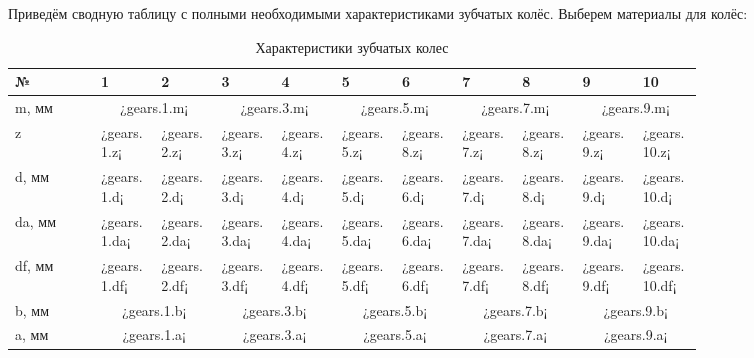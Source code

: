 \documentclass[14pt,a4paper,russian]{scrartcl}
\begin{document}
        Приведём сводную таблицу с полными необходимыми характеристиками зубчатых колёс.
        Выберем материалы для колёс:
        \begin{table}[h!]
            \begin{center}
                \begin{tabular}{p{0.1\linewidth}|p{0.07\linewidth}p{0.07\linewidth}p{0.07\linewidth}p{0.07\linewidth}p{0.07\linewidth}p{0.07\linewidth}p{0.07\linewidth}p{0.07\linewidth}p{0.07\linewidth}p{0.07\linewidth}}
                    \hline
                    №   & 1&2&3&4&5&6&7&8&9&10\\
                    \hline
                    m, мм  & \multicolumn{2}{c}{¿gears.1.m¡} & \multicolumn{2}{c}{¿gears.3.m¡} & \multicolumn{2}{c}{¿gears.5.m¡} & \multicolumn{2}{c}{¿gears.7.m¡} & \multicolumn{2}{c}{¿gears.9.m¡} \\
                    z       & ¿gears.1.z¡ &  ¿gears.2.z¡ &  ¿gears.3.z¡ &  ¿gears.4.z¡ &  ¿gears.5.z¡ & ¿gears.8.z¡ &   ¿gears.7.z¡ &  ¿gears.8.z¡ &  ¿gears.9.z¡ &  ¿gears.10.z¡ \\
                    d, мм   & ¿gears.1.d¡ &  ¿gears.2.d¡ &  ¿gears.3.d¡ &  ¿gears.4.d¡ &  ¿gears.5.d¡ & ¿gears.6.d¡ &   ¿gears.7.d¡ &  ¿gears.8.d¡ &  ¿gears.9.d¡ &  ¿gears.10.d¡ \\
                    da, мм  & ¿gears.1.da¡ & ¿gears.2.da¡ & ¿gears.3.da¡ & ¿gears.4.da¡ & ¿gears.5.da¡ & ¿gears.6.da¡ & ¿gears.7.da¡ & ¿gears.8.da¡ & ¿gears.9.da¡ & ¿gears.10.da¡ \\
                    df, мм  & ¿gears.1.df¡ & ¿gears.2.df¡ & ¿gears.3.df¡ & ¿gears.4.df¡ & ¿gears.5.df¡ & ¿gears.6.df¡ & ¿gears.7.df¡ & ¿gears.8.df¡ & ¿gears.9.df¡ & ¿gears.10.df¡ \\
                    b, мм & \multicolumn{2}{c}{¿gears.1.b¡} &  \multicolumn{2}{c}{¿gears.3.b¡} &  \multicolumn{2}{c}{¿gears.5.b¡} & \multicolumn{2}{c}{¿gears.7.b¡} &\multicolumn{2}{c}{¿gears.9.b¡} \\
                    a, мм & \multicolumn{2}{c}{¿gears.1.a¡} & \multicolumn{2}{c}{¿gears.3.a¡} & \multicolumn{2}{c}{¿gears.5.a¡} & \multicolumn{2}{c}{¿gears.7.a¡} & \multicolumn{2}{c}{¿gears.9.a¡} \\
                    \hline
                \end{tabular}
                \caption{{Характеристики зубчатых колес}}\label{tab:gears_digest}
            \end{center}
        \end{table}
\end{document}
